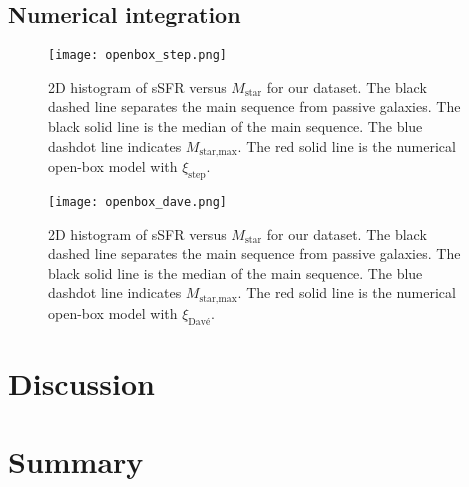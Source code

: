 \documentclass[fleqn,usenatbib]{mnras}
\begin{document}
\subsection{Numerical integration}\label{sec:numerical_integration}
\begin{figure}\centering
	\texttt{[image: openbox\_step.png]}
    \caption{2D histogram of sSFR versus $M_{\text{star}}$ for our dataset. The black dashed line separates the main sequence from passive galaxies. The black solid line is the median of the main sequence. The blue dashdot line indicates $M_{\text{star,max}}$. The red solid line is the numerical open-box model with $\xi_\text{step}$.}
    \label{fig:openbox_step}
\end{figure}

\begin{figure}\centering
	\texttt{[image: openbox\_dave.png]}
    \caption{2D histogram of sSFR versus $M_{\text{star}}$ for our dataset. The black dashed line separates the main sequence from passive galaxies. The black solid line is the median of the main sequence. The blue dashdot line indicates $M_{\text{star,max}}$. The red solid line is the numerical open-box model with $\xi_\text{Davé}$.}
    \label{fig:openbox_dave}
\end{figure}



\section{Discussion}\label{sec:discussion}




\section{Summary}\label{sec:summary}






 


\label{lastpage}
\end{document}

